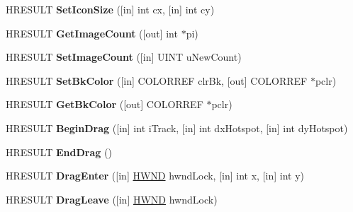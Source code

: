 \begin{DoxyCompactItemize}
\mbox{\label{interface_i_image_list_a76cef04a7ef997d88b18756d735c1a58}} 
H\+R\+E\+S\+U\+LT {\bfseries Set\+Icon\+Size} (\mbox{[}in\mbox{]} int cx, \mbox{[}in\mbox{]} int cy)
\item 
\mbox{\label{interface_i_image_list_abd646356fb68c40c5c7bea26a456a96d}} 
H\+R\+E\+S\+U\+LT {\bfseries Get\+Image\+Count} (\mbox{[}out\mbox{]} int $\ast$pi)
\item 
\mbox{\label{interface_i_image_list_a7021b445b9b9bfa7f88549e0c7829d4b}} 
H\+R\+E\+S\+U\+LT {\bfseries Set\+Image\+Count} (\mbox{[}in\mbox{]} U\+I\+NT u\+New\+Count)
\item 
\mbox{\label{interface_i_image_list_a9a22e8b694132fbd2cea43ef08a70da2}} 
H\+R\+E\+S\+U\+LT {\bfseries Set\+Bk\+Color} (\mbox{[}in\mbox{]} C\+O\+L\+O\+R\+R\+EF clr\+Bk, \mbox{[}out\mbox{]} C\+O\+L\+O\+R\+R\+EF $\ast$pclr)
\item 
\mbox{\label{interface_i_image_list_a5c1e2995329c27011334685c0dfa119f}} 
H\+R\+E\+S\+U\+LT {\bfseries Get\+Bk\+Color} (\mbox{[}out\mbox{]} C\+O\+L\+O\+R\+R\+EF $\ast$pclr)
\item 
\mbox{\label{interface_i_image_list_abb92330047e6949f8f817f0e4ec2c82a}} 
H\+R\+E\+S\+U\+LT {\bfseries Begin\+Drag} (\mbox{[}in\mbox{]} int i\+Track, \mbox{[}in\mbox{]} int dx\+Hotspot, \mbox{[}in\mbox{]} int dy\+Hotspot)
\item 
\mbox{\label{interface_i_image_list_a3576404df5a3666797dc11af76046e30}} 
H\+R\+E\+S\+U\+LT {\bfseries End\+Drag} ()
\item 
\mbox{\label{interface_i_image_list_a84b468962b2c4f77f9b5b96186b77394}} 
H\+R\+E\+S\+U\+LT {\bfseries Drag\+Enter} (\mbox{[}in\mbox{]} \hyperlink{interfacevoid}{H\+W\+ND} hwnd\+Lock, \mbox{[}in\mbox{]} int x, \mbox{[}in\mbox{]} int y)
\item 
\mbox{\label{interface_i_image_list_ac0f6a6f278c4921c9440386743190db8}} 
H\+R\+E\+S\+U\+LT {\bfseries Drag\+Leave} (\mbox{[}in\mbox{]} \hyperlink{interfacevoid}{H\+W\+ND} hwnd\+Lock)

\end{DoxyCompactItemize}
